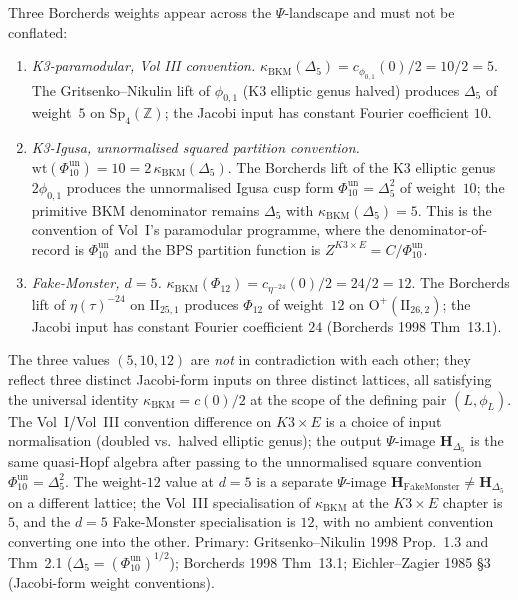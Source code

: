 \begin{remark}
\label{rem:k3ebkm-ap5-weight-12-vs-5}
Three Borcherds weights appear across the $\Psi$-landscape and must
not be conflated:
\begin{enumerate}
\item \emph{K3-paramodular, Vol III convention.}
$\kappa_{\mathrm{BKM}}(\Delta_5) = c_{\phi_{0,1}}(0)/2 = 10/2 = 5$.
The Gritsenko--Nikulin lift of $\phi_{0,1}$ (K3 elliptic genus
halved) produces $\Delta_5$ of weight~$5$ on $\mathrm{Sp}_4(\mathbb Z)$;
the Jacobi input has constant Fourier coefficient $10$.
\item \emph{K3-Igusa, unnormalised squared partition convention.}
\(\mathrm{wt}(\Phi_{10}^{\mathrm{un}}) = 10 = 2\,\kappa_{\mathrm{BKM}}(\Delta_5)\).
The Borcherds lift of the K3 elliptic genus $2\phi_{0,1}$ produces the
unnormalised Igusa cusp form \(\Phi_{10}^{\mathrm{un}}=\Delta_5^2\) of weight~$10$; the primitive
BKM denominator remains $\Delta_5$ with $\kappa_{\mathrm{BKM}}(\Delta_5)=5$. This is the convention
of Vol~I's paramodular programme, where the denominator-of-record is
\(\Phi_{10}^{\mathrm{un}}\) and the BPS partition function is
\(Z^{K3\times E}=C/\Phi_{10}^{\mathrm{un}}\).
\item \emph{Fake-Monster, $d = 5$.}
$\kappa_{\mathrm{BKM}}(\Phi_{12}) = c_{\eta^{-24}}(0)/2 = 24/2 = 12$.
The Borcherds lift of $\eta(\tau)^{-24}$ on $\mathrm{II}_{25,1}$
produces $\Phi_{12}$ of weight~$12$ on $\mathrm{O}^+(\mathrm{II}_{26,2})$;
the Jacobi input has constant Fourier coefficient $24$
(Borcherds 1998 Thm~13.1).
\end{enumerate}
The three values $(5, 10, 12)$ are \emph{not} in contradiction with
each other; they reflect three distinct Jacobi-form inputs on three
distinct lattices, all satisfying the universal identity
$\kappa_{\mathrm{BKM}} = c(0)/2$ at the scope of the defining pair
$(L,\phi_L)$. The Vol~I/Vol~III convention difference on $K3\times E$
is a choice of input normalisation (doubled vs.\ halved elliptic
genus); the output \(\Psi\)-image \(\mathbf H_{\Delta_5}\) is the same
quasi-Hopf algebra after passing to the unnormalised square convention
\(\Phi_{10}^{\mathrm{un}}=\Delta_5^2\). The weight-$12$
value at $d = 5$ is a separate $\Psi$-image
$\mathbf H_{\mathrm{FakeMonster}}\neq\mathbf H_{\Delta_5}$ on a
different lattice; the Vol~III specialisation of $\kappa_{\mathrm{BKM}}$
at the $K3\times E$ chapter is $5$, and the $d=5$ Fake-Monster
specialisation is $12$, with no ambient convention converting one into
the other. Primary: Gritsenko--Nikulin 1998 Prop.~1.3 and Thm~2.1
(\(\Delta_5 = (\Phi_{10}^{\mathrm{un}})^{1/2}\)); Borcherds 1998 Thm~13.1; Eichler--Zagier
1985 \S3 (Jacobi-form weight conventions).
\end{remark}

